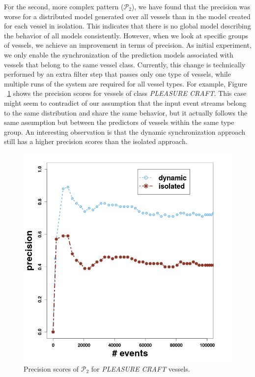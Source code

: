 \par For the second, more complex pattern ($\mathcal{P}_2$), we have found that the precision was worse for a distributed model generated over all vessels than in the model created for each vessel in isolation. This indicates that there is no global model describing the behavior of all models consistently. However, when we look at specific groups of vessels, we achieve an improvement in terms of precision. As initial experiment, we only enable the synchronization of the prediction models associated with vessels that belong to the same vessel class. Currently, this change is technically performed by an extra filter step that passes only one type of vessels, while multiple runs of the system are required for all vessel types. For example, Figure ~\ref{fig:precsions_p2} shows the precision scores for vessels of class \textit{PLEASURE CRAFT}. This case might seem to contradict of our assumption that the input event streams belong to the same distribution and share the same behavior, but it actually follows the same assumption but between the predictors of vessels within the same type group. An interesting observation is that the dynamic synchronization approach still has a higher precision scores than the isolated approach.

\begin{figure}[H]
	\centering
	\includegraphics[width=\textwidth,height=.55\textheight]{chapters/figures/synopses/p2_precision_100_2_08.png}
	
	\caption{Precision scores of $\mathcal{P}_2$  for \textit{PLEASURE CRAFT} vessels.}
	\label{fig:precsions_p2}
\end{figure}

